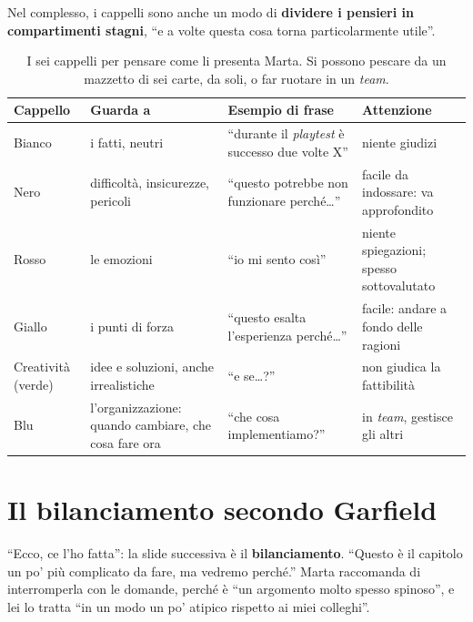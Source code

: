 Nel complesso, i cappelli sono anche un modo di \textbf{dividere i pensieri in compartimenti
stagni}, ``e a volte questa cosa torna particolarmente utile''.

\begin{table}[htbp]
\centering
\small
\begin{tabular}{@{}p{2.3cm}p{3.6cm}p{3.9cm}p{3.7cm}@{}}
\toprule
\textbf{Cappello} & \textbf{Guarda a} & \textbf{Esempio di frase} & \textbf{Attenzione} \\
\midrule
Bianco & i fatti, neutri & ``durante il \emph{playtest} è successo due volte X'' & niente
  giudizi \\
\addlinespace
Nero & difficoltà, insicurezze, pericoli & ``questo potrebbe non funzionare perché\ldots'' &
  facile da indossare: va approfondito \\
\addlinespace
Rosso & le emozioni & ``io mi sento così'' & niente spiegazioni; spesso sottovalutato \\
\addlinespace
Giallo & i punti di forza & ``questo esalta l'esperienza perché\ldots'' & facile: andare a
  fondo delle ragioni \\
\addlinespace
Creatività (verde) & idee e soluzioni, anche irrealistiche & ``e se\ldots?'' & non giudica
  la fattibilità \\
\addlinespace
Blu & l'organizzazione: quando cambiare, che cosa fare ora & ``che cosa implementiamo?'' &
  in \emph{team}, gestisce gli altri \\
\bottomrule
\end{tabular}
\caption{I sei cappelli per pensare come li presenta Marta. Si possono pescare da un mazzetto
di sei carte, da soli, o far ruotare in un \emph{team}.}
\label{a14:tab:cappelli}
\end{table}

\section{Il bilanciamento secondo Garfield}
\label{a14:sec:garfield}



``Ecco, ce l'ho fatta'': la slide successiva è il \textbf{bilanciamento}. ``Questo è il capitolo
un po' più complicato da fare, ma vedremo perché.'' Marta raccomanda di interromperla con le
domande, perché è ``un argomento molto spesso spinoso'', e lei lo tratta ``in un modo un po'
atipico rispetto ai miei colleghi''.

